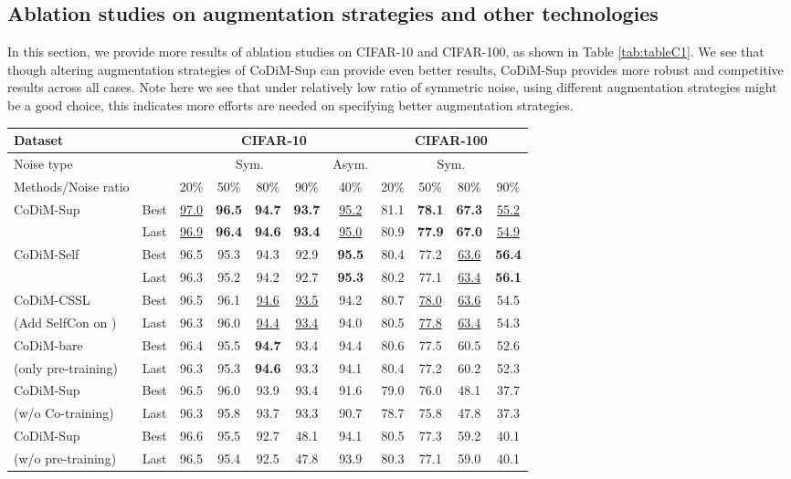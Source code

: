 \documentclass[letterpaper]{article} \usepackage{aaai22}  \usepackage{times}  \usepackage{helvet}  \usepackage{courier}  \usepackage[hyphens]{url}  \usepackage{graphicx} \usepackage{subfigure}
\begin{document}
\subsection{Ablation studies on augmentation strategies and other technologies}
In this section, we provide more results of ablation studies on CIFAR-10 and CIFAR-100, as shown in Table \ref{tab:tableC1}. We see that though altering augmentation strategies of CoDiM-Sup can provide even better results, CoDiM-Sup provides more robust and competitive results across all cases. Note here we see that under relatively low ratio of symmetric noise, using different augmentation strategies might be a good choice, this indicates more efforts are needed on specifying better augmentation strategies. 
\begin{table*}[ht]
\begin{center}
\begin{tabular}{lcccccccccc}
\hline
Dataset & & \multicolumn{5}{c}{CIFAR-10} & \multicolumn{4}{c}{CIFAR-100}\\
\hline
Noise type & & \multicolumn{4}{c}{Sym.} & Asym. & \multicolumn{4}{c}{Sym.} \\
\hline
Methods/Noise ratio & & 20\% & 50\% & 80\% & 90\% & 40\% & 20\% & 50\% & 80\% & 90\% \\
\hline
\multirow{2}{*}{CoDiM-Sup} & Best & \underline{97.0} & \textbf{96.5} & \textbf{94.7} & \textbf{93.7} & \underline{95.2} & 81.1 & \textbf{78.1} & \textbf{67.3} & \underline{55.2}\\
& Last & \underline{96.9} & \textbf{96.4} & \textbf{94.6} & \textbf{93.4} & \underline{95.0} & 80.9 & \textbf{77.9} & \textbf{67.0} & \underline{54.9} \\
\hline
\multirow{2}{*}{CoDiM-Self} & Best & 96.5 & 95.3 & 94.3 & 92.9 & \textbf{95.5} & 80.4 & 77.2 & \underline{63.6} & \textbf{56.4} \\
& Last & 96.3 & 95.2 & 94.2 & 92.7 & \textbf{95.3} & 80.2 & 77.1 & \underline{63.4} & \textbf{56.1} \\
\hline
CoDiM-CSSL & Best & 96.5 & 96.1 & \underline{94.6} & \underline{93.5} & 94.2 & 80.7 & \underline{78.0} & \underline{63.6} & 54.5 \\
(Add SelfCon on )& Last & 96.3 & 96.0 & \underline{94.4} & \underline{93.4} & 94.0 & 80.5 & \underline{77.8} & \underline{63.4} & 54.3 \\
\hline
CoDiM-bare & Best & 96.4 & 95.5 & \textbf{94.7} & 93.4 & 94.4 & 80.6 & 77.5 & 60.5 & 52.6 \\
(only pre-training) & Last & 96.3 & 95.3 & \textbf{94.6} & 93.3 & 94.1 & 80.4 & 77.2 & 60.2 & 52.3 \\
\hline
{CoDiM-Sup } & Best & 96.5 & 96.0 & 93.9 & 93.4 & 91.6 & 79.0 & 76.0 & 48.1 & 37.7 \\
(w/o Co-training) & Last & 96.3 & 95.8 & 93.7 & 93.3 & 90.7 & 78.7 & 75.8 & 47.8 & 37.3 \\
\hline
CoDiM-Sup & Best & 96.6 & 95.5 & 92.7 & 48.1 & 94.1 & 80.5 & 77.3 & 59.2 & 40.1 \\
(w/o pre-training)& Last & 96.5 & 95.4 & 92.5 & 47.8 & 93.9 & 80.3 & 77.1 & 59.0 & 40.1 \\
\hline


\end{tabular}
\end{center}
\end{table*}
\end{document}
